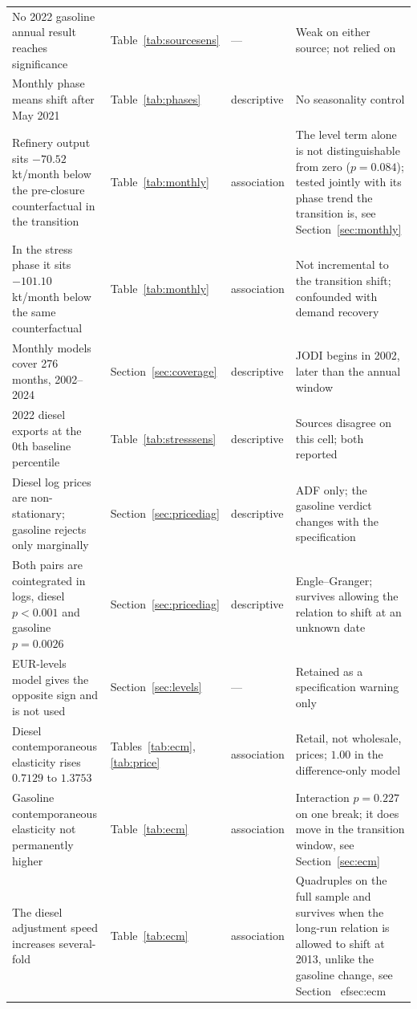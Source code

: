 \documentclass[11pt,a4paper]{article}
\begin{document}
\begin{longtable}{L{4.1cm}L{3.5cm}L{2.2cm}L{4.4cm}}
No 2022 gasoline annual result reaches significance & Table~\ref{tab:sourcesens} & --- & Weak on either source; not relied on \\
Monthly phase means shift after May 2021 & Table~\ref{tab:phases} & descriptive & No seasonality control \\
Refinery output sits $-70.52$ kt/month below the pre-closure counterfactual in the transition & Table~\ref{tab:monthly} & association & The level term alone is not distinguishable from zero ($p=0.084$); tested jointly with its phase trend the transition is, see Section~\ref{sec:monthly} \\
In the stress phase it sits $-101.10$ kt/month below the same counterfactual & Table~\ref{tab:monthly} & association & Not incremental to the transition shift; confounded with demand recovery \\
Monthly models cover 276 months, 2002--2024 & Section~\ref{sec:coverage} & descriptive & JODI begins in 2002, later than the annual window \\
2022 diesel exports at the 0th baseline percentile & Table~\ref{tab:stresssens} & descriptive & Sources disagree on this cell; both reported \\
Diesel log prices are non-stationary; gasoline rejects only marginally & Section~\ref{sec:pricediag} & descriptive & ADF only; the gasoline verdict changes with the specification \\
Both pairs are cointegrated in logs, diesel $p<0.001$ and gasoline $p=0.0026$ & Section~\ref{sec:pricediag} & descriptive & Engle--Granger; survives allowing the relation to shift at an unknown date \\
EUR-levels model gives the opposite sign and is not used & Section~\ref{sec:levels} & --- & Retained as a specification warning only \\
Diesel contemporaneous elasticity rises $0.7129$ to $1.3753$ & Tables~\ref{tab:ecm}, \ref{tab:price} & association & Retail, not wholesale, prices; $1.00$ in the difference-only model \\
Gasoline contemporaneous elasticity not permanently higher & Table~\ref{tab:ecm} & association & Interaction $p=0.227$ on one break; it does move in the transition window, see Section~\ref{sec:ecm} \\
The diesel adjustment speed increases several-fold & Table~\ref{tab:ecm} & association & Quadruples on the full sample and survives when the long-run relation is allowed to shift at 2013, unlike the gasoline change, see Section~
ef{sec:ecm} \\

\end{longtable}
\end{document}

